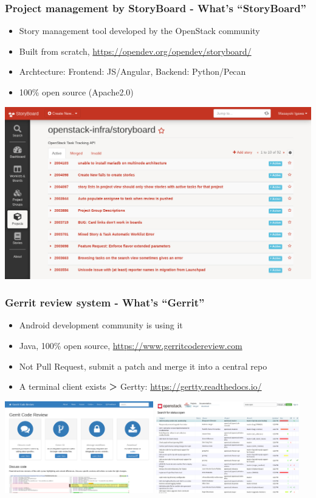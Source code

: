 \documentclass[aspectratio=169,11pt,hyperref={colorlinks=true}]{beamer}
\begin{document}
\begin{frame}
  \frametitle{Project management by StoryBoard - What's ``StoryBoard''}
  \begin{itemize}
    \item Story management tool developed by the OpenStack community
    \item Built from scratch, \url{https://opendev.org/opendev/storyboard/}
    \item Archtecture: {Frontend: JS/Angular, Backend: Python/Pecan}
    \item 100\% open source (Apache2.0)
  \end{itemize}
  \centering\includegraphics[scale=0.2]{images/storyboard.png}
\end{frame}

\begin{frame}
  \frametitle{Gerrit review system - What's ``Gerrit''}
  \begin{itemize}
    \item Android development community is using it
    \item Java, 100\% open source, \url{https://www.gerritcodereview.com}
    \item Not Pull Request, submit a patch and merge it into a central repo
    \item A terminal client exists ＞ Gertty: \url{https://gertty.readthedocs.io/}
  \end{itemize}
  \centering
  \includegraphics[height=40mm]{images/gerritcodereview-com.png}
  \includegraphics[height=40mm]{images/review-openstack-org.png}
\end{frame}
\end{document}
